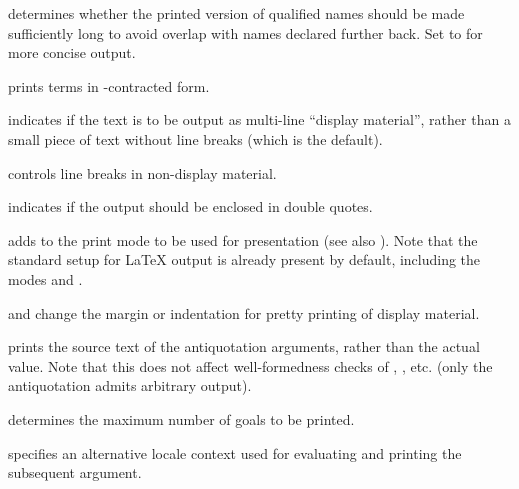 \begin{isabellebody}
\begin{isamarkuptext}
\begin{descr}
  \item[\isa{unique{\isacharunderscore}names\ {\isacharequal}\ bool}] determines whether the printed
  version of qualified names should be made sufficiently long to avoid
  overlap with names declared further back.  Set to  for
  more concise output.

  \item[\isa{eta{\isacharunderscore}contract\ {\isacharequal}\ bool}] prints terms in \isa{{\isasymeta}}-contracted form.

  \item[\isa{display\ {\isacharequal}\ bool}] indicates if the text is to be
  output as multi-line ``display material'', rather than a small piece
  of text without line breaks (which is the default).

  \item[\isa{break\ {\isacharequal}\ bool}] controls line breaks in non-display
  material.

  \item[\isa{quotes\ {\isacharequal}\ bool}] indicates if the output should be
  enclosed in double quotes.

  \item[\isa{mode\ {\isacharequal}\ name}] adds  to the print mode to
  be used for presentation (see also \cite{isabelle-ref}).  Note that
  the standard setup for {\LaTeX} output is already present by
  default, including the modes  and .

  \item[\isa{margin\ {\isacharequal}\ nat} and \isa{indent\ {\isacharequal}\ nat}] change the
  margin or indentation for pretty printing of display material.

  \item[\isa{source\ {\isacharequal}\ bool}] prints the source text of the
  antiquotation arguments, rather than the actual value.  Note that
  this does not affect well-formedness checks of , , etc. (only the  antiquotation admits arbitrary output).

  \item[\isa{goals{\isacharunderscore}limit\ {\isacharequal}\ nat}] determines the maximum number of
  goals to be printed.

  \item[\isa{locale\ {\isacharequal}\ name}] specifies an alternative locale
  context used for evaluating and printing the subsequent argument.

  \end{descr}


\end{isamarkuptext}
\end{isabellebody}
